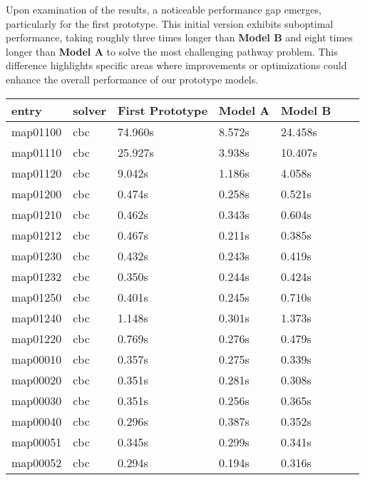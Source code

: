Upon examination of the results, a noticeable performance gap emerges, particularly for the first prototype. This initial version exhibits suboptimal performance, taking roughly three times longer than \textbf{Model B} and eight times longer than \textbf{Model A} to solve the most challenging pathway problem. This difference highlights specific areas where improvements or optimizations could enhance the overall performance of our prototype models.

\begin{table}[H]
\centering
\begin{tabular}{|l|l|l|l|l|l|l|}
\hline
\rowcolor[HTML]{C0C0C0} 
entry    & solver     & First Prototype & Model A & Model B  \\\hline
map01100 & cbc & 74.960s           & 8.572s        & 24.458s       \\\hline
map01110 & cbc & 25.927s          & 3.938s       & 10.407s       \\\hline
map01120 & cbc & 9.042s           & 1.186s       & 4.058s        \\\hline
map01200 & cbc & 0.474s         & 0.258s       & 0.521s        \\\hline
map01210 & cbc & 0.462s          & 0.343s      & 0.604s        \\\hline
map01212 & cbc & 0.467s          & 0.211s      & 0.385s       \\\hline
map01230 & cbc & 0.432s          & 0.243s      & 0.419s       \\\hline
map01232 & cbc & 0.350s          & 0.244s      & 0.424s      \\ \hline
map01250 & cbc & 0.401s          & 0.245s       & 0.710s       \\\hline
map01240 & cbc & 1.148s          & 0.301s       & 1.373s        \\\hline
map01220 & cbc & 0.769s          & 0.276s       & 0.479s       \\\hline
map00010 & cbc & 0.357s          & 0.275s      & 0.339s      \\\hline
map00020 & cbc & 0.351s          & 0.281s      & 0.308s      \\\hline
map00030 & cbc & 0.351s         & 0.256s       & 0.365s       \\\hline
map00040 & cbc & 0.296s         & 0.387s      & 0.352s        \\\hline
map00051 & cbc & 0.345s         & 0.299s       & 0.341s      \\\hline
map00052 & cbc & 0.294s          & 0.194s      & 0.316s       \\\hline

\end{tabular}
\end{table}
